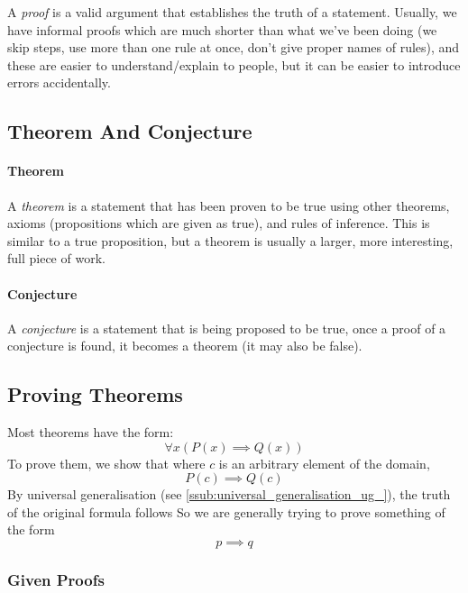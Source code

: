 A \emph{proof} is a valid argument that establishes the truth of a statement.
Usually, we have informal proofs which are much shorter than what we've been doing (we skip steps, use more than one rule at once, don't give proper names of rules), and these are easier to understand/explain to people, but it can be easier to introduce errors accidentally.

\subsection{Theorem And Conjecture}\label{sub:theorem_and_conjecture}

\paragraph{Theorem}\label{par:theorem}

A \emph{theorem} is a statement that has been proven to be true using other theorems, axioms (propositions which are given as true), and rules of inference.
This is similar to a true proposition, but a theorem is usually a larger, more interesting, full piece of work.

\paragraph{Conjecture}\label{par:conjecture}

A \emph{conjecture} is a statement that is being proposed to be true, once a proof of a conjecture is found, it becomes a theorem (it may also be false).

\subsection{Proving Theorems}\label{sub:proving_theorems}

Most theorems have the form:
\[
    \forall x (P(x) \implies Q(x))
\]
To prove them, we show that where \(c\) is an arbitrary element of the domain,
\[
    P(c) \implies Q(c)
\]
By universal generalisation (see \cref{ssub:universal_generalisation_ug_}), the truth of the original formula follows
So we are generally trying to prove something of the form
\[
    p \implies q
\]

\subsubsection{Given Proofs}\label{ssub:given_proofs}

